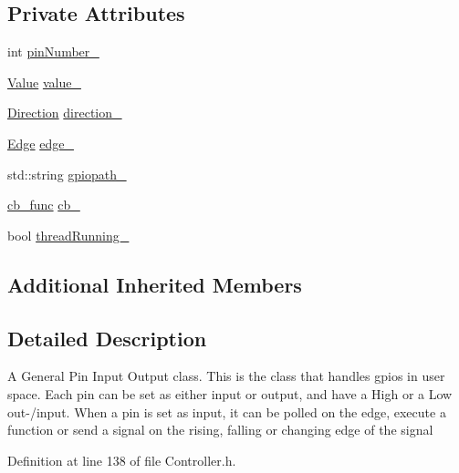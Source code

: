 \subsection*{Private Attributes}
\begin{DoxyCompactItemize}
\item 
int \hyperlink{classo_cpt_1_1protocol_1_1gpio_a618c388f95fff31d6decf7f8760e76a9}{pin\+Number\+\_\+}
\item 
\hyperlink{classo_cpt_1_1protocol_1_1gpio_a7d2d1d34f177f209ad642098d168656f}{Value} \hyperlink{classo_cpt_1_1protocol_1_1gpio_a301d39638a420a299728d353ade3997c}{value\+\_\+}
\item 
\hyperlink{classo_cpt_1_1protocol_1_1gpio_af7acf963933bbc47d11d6fa1b8ce4d5b}{Direction} \hyperlink{classo_cpt_1_1protocol_1_1gpio_adb5c9fe44ef91bf37812e9cdfd3141d4}{direction\+\_\+}
\item 
\hyperlink{classo_cpt_1_1protocol_1_1gpio_adbbd34b2bc4394ad5a71d94641dda9f9}{Edge} \hyperlink{classo_cpt_1_1protocol_1_1gpio_abdd5f6e987fdca5748a35622f72eaf2f}{edge\+\_\+}
\item 
std\+::string \hyperlink{classo_cpt_1_1protocol_1_1gpio_afac9293096c2636fcce60aff2b38698d}{gpiopath\+\_\+}
\item 
\hyperlink{classo_cpt_1_1protocol_1_1gpio_ad553926a5fc9db445e7c9715abede2e3}{cb\+\_\+func} \hyperlink{classo_cpt_1_1protocol_1_1gpio_a7d9d6a711dd0ba0d51649b85ca4d5bf4}{cb\+\_\+}
\item 
bool \hyperlink{classo_cpt_1_1protocol_1_1gpio_aefa2c3a350dce68af5b9eea8b84f0336}{thread\+Running\+\_\+}
\end{DoxyCompactItemize}
\subsection*{Additional Inherited Members}


\subsection{Detailed Description}
A General Pin Input Output class. This is the class that handles gpio\textquotesingle{}s in user space. Each pin can be set as either input or output, and have a High or a Low out-\//input. When a pin is set as input, it can be polled on the edge, execute a function or send a signal on the rising, falling or changing edge of the signal 

Definition at line 138 of file Controller.\+h.



